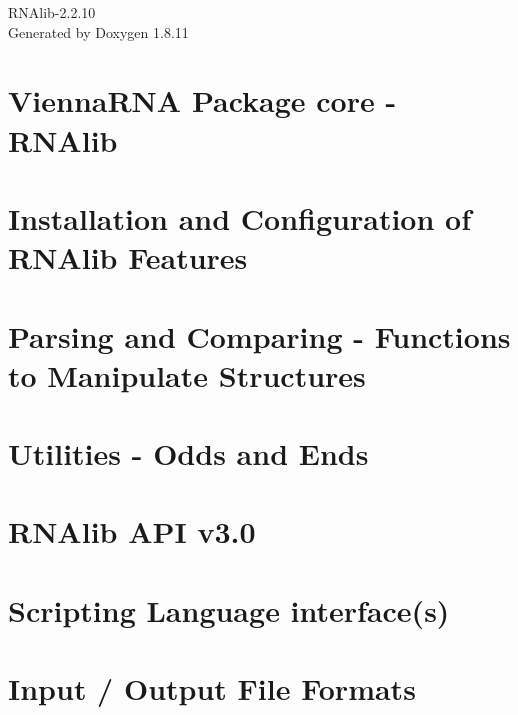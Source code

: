\documentclass[twoside]{book}
\newcommand{\+}{\discretionary{\mbox{\scriptsize$\hookleftarrow$}}{}{}}
\newcommand{\clearemptydoublepage}{%
  \newpage{\pagestyle{empty}\cleardoublepage}%
}
\begin{document}
\hypersetup{pageanchor=false,
             bookmarksnumbered=true,
             pdfencoding=unicode
            }
\begin{titlepage}
\vspace*{7cm}
\begin{center}%
{\Large R\+N\+Alib-\/2.2.10 }\\
\vspace*{1cm}
{\large Generated by Doxygen 1.8.11}\\
\end{center}
\end{titlepage}
\clearemptydoublepage
\tableofcontents
\clearemptydoublepage
{}
\hypersetup{pageanchor=true}

\chapter{Vienna\+R\+NA Package core -\/ R\+N\+Alib}
\label{index}\hypertarget{index}{}
\chapter{Installation and Configuration of R\+N\+Alib Features}
\label{install}
\hypertarget{install}{}

\chapter{Parsing and Comparing -\/ Functions to Manipulate Structures}
\label{mp_parse}
\hypertarget{mp_parse}{}

\chapter{Utilities -\/ Odds and Ends}
\label{mp_utils}
\hypertarget{mp_utils}{}

\chapter{R\+N\+Alib A\+PI v3.0}
\label{newAPI}
\hypertarget{newAPI}{}

\chapter{Scripting Language interface(s)}
\label{scripting}
\hypertarget{scripting}{}

\chapter{Input / Output File Formats}
\label{file_formats}
\hypertarget{file_formats}{}

\end{document}
